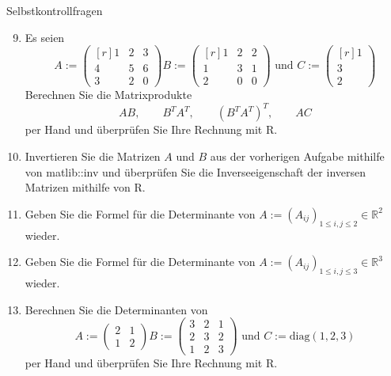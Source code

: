 \documentclass[
  8pt,
  ignorenonframetext,
]{beamer}
\begin{document}
\begin{frame}{Selbstkontrollfragen}
\protect\hypertarget{selbstkontrollfragen-1}{}
\footnotesize
\begin{enumerate}
\setcounter{enumi}{8}
\item Es seien
\begin{equation}
A :=
\begin{pmatrix*}[r]
1 & 2 & 3 \\
4 & 5 & 6 \\
3 & 2 & 0
\end{pmatrix*}
B :=
\begin{pmatrix*}[r]
1 & 2 & 2 \\
1 & 3 & 1 \\
2 & 0 & 0
\end{pmatrix*}
\mbox{ und }
C :=
\begin{pmatrix*}[r]
1 \\ 3 \\ 2
\end{pmatrix*}
\end{equation}
Berechnen Sie die Matrixprodukte
\begin{equation}
AB , \quad\quad
B^TA^T, \quad\quad
\left(B^TA^T\right)^T, \quad\quad
AC
\end{equation}
per Hand und überprüfen Sie Ihre Rechnung mit R.



\item Invertieren Sie die Matrizen $A$ und $B$ aus der vorherigen Aufgabe mithilfe
von matlib::inv und überprüfen Sie die Inverseeigenschaft der inversen Matrizen
mithilfe von R.



\item Geben Sie die Formel für die Determinante von $A := (A_{ij})_{1 \le i,j \le 2} \in \mathbb{R}^2$ wieder.
\item Geben Sie die Formel für die Determinante von $A := (A_{ij})_{1 \le i,j \le 3} \in \mathbb{R}^3$ wieder.
\item Berechnen Sie die Determinanten von
\begin{equation}
A := \begin{pmatrix} 2 & 1 \\ 1 & 2 \end{pmatrix}
B := \begin{pmatrix} 3 & 2 & 1 \\ 2 & 3 & 2 \\ 1 & 2 & 3 \end{pmatrix} \mbox{ und }
C := \mbox{diag}(1,2,3)
\end{equation}
per Hand und überprüfen Sie Ihre Rechnung mit R.
\end{enumerate}
\end{frame}
\end{document}
